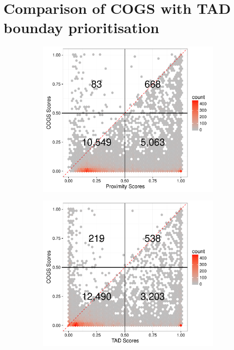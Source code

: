 \documentclass[a4paper,11pt]{report}
\begin{document}
\section{Comparison of COGS with TAD bounday prioritisation}
\begin{figure}[h]
\centering
	 \begin{subfigure}{0.7\textwidth}
		\includegraphics[width=\linewidth]{prox_compare.pdf}
		\caption{}\label{fig:fig_a}
	\end{subfigure}
	\hspace{1cm}
	\begin{subfigure}{0.7\textwidth}
		\includegraphics[width=\linewidth]{tad_compare.pdf}

\end{subfigure}
\end{figure}
\end{document}
